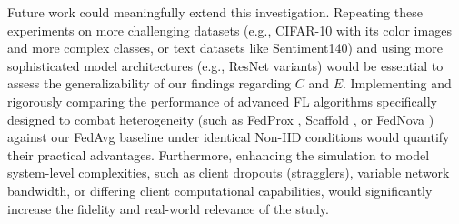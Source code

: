 \documentclass[conference]{IEEEtran}
\begin{document}
Future work could meaningfully extend this investigation. Repeating these experiments on more challenging datasets (e.g., CIFAR-10 with its color images and more complex classes, or text datasets like Sentiment140) and using more sophisticated model architectures (e.g., ResNet variants) would be essential to assess the generalizability of our findings regarding $C$ and $E$. Implementing and rigorously comparing the performance of advanced FL algorithms specifically designed to combat heterogeneity (such as FedProx \cite{b8}, Scaffold \cite{b7}, or FedNova \cite{b19}) against our FedAvg baseline under identical Non-IID conditions would quantify their practical advantages. Furthermore, enhancing the simulation to model system-level complexities, such as client dropouts (stragglers), variable network bandwidth, or differing client computational capabilities, would significantly increase the fidelity and real-world relevance of the study.
\end{document}
